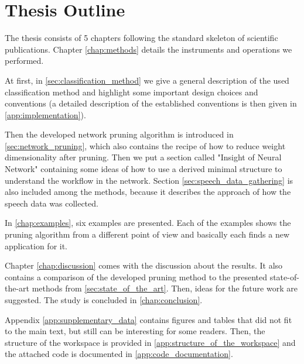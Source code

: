 \section{Thesis Outline} \label{sec:thesis_outline}
The thesis consists of 5 chapters following the standard skeleton of scientific publications. Chapter \ref{chap:methods} details the instruments and operations we performed. 

At first, in \cref{sec:classification_method} we give a general description of the used classification method and highlight some important design choices and conventions (a detailed description of the established conventions is then given in \cref{app:implementation}). 

Then the developed network pruning algorithm is introduced in \cref{sec:network_pruning}, which also contains the recipe of how to reduce weight dimensionality after pruning. Then we put a section called "Insight of Neural Network" containing some ideas of how to use a derived minimal structure to understand the workflow in the network. Section \ref{sec:speech_data_gathering} is also included among the methods, because it describes the approach of how the speech data was collected.

In \cref{chap:examples}, six examples are presented. Each of the examples shows the pruning algorithm from a different point of view and basically each finds a new application for it.

Chapter \ref{chap:discussion} comes with the discussion about the results. It also contains a comparison of the developed pruning method to the presented state-of-the-art methods from \cref{sec:state_of_the_art}. Then, ideas for the future work are suggested. The study is concluded in \cref{chap:conclusion}.

Appendix \ref{app:supplementary_data} contains figures and tables that did not fit to the main text, but still can be interesting for some readers. Then, the structure of the workspace is provided in \cref{app:structure_of_the_workspace} and the attached code is documented in \cref{app:code_documentation}.